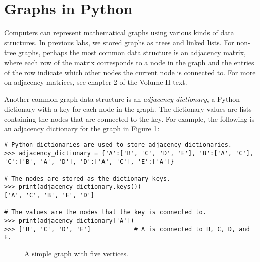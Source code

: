 

\section*{Graphs in Python} %

Computers can represent mathematical graphs using various kinds of data structures.
In previous labs, we stored graphs as trees and linked lists.
For non-tree graphs, perhaps the most common data structure is an adjacency matrix, where each row of the matrix corresponds to a node in the graph and the entries of the row indicate which other nodes the current node is connected to.
For more on adjacency matrices, see chapter 2 of the Volume II text.

Another common graph data structure is an \emph{adjacency dictionary}, a Python dictionary with a key for each node in the graph.
The dictionary values are lists containing the nodes that are connected to the key.
For example, the following is an adjacency dictionary for the graph in Figure \ref{fig:simple_graph}:

\begin{lstlisting}
# Python dictionaries are used to store adjacency dictionaries.
>>> adjacency_dictionary = {'A':['B', 'C', 'D', 'E'], 'B':['A', 'C'],
'C':['B', 'A', 'D'], 'D':['A', 'C'], 'E':['A']}

# The nodes are stored as the dictionary keys.
>>> print(adjacency_dictionary.keys())
['A', 'C', 'B', 'E', 'D']

# The values are the nodes that the key is connected to.
>>> print(adjacency_dictionary['A'])
>>> ['B', 'C', 'D', 'E']            # A is connected to B, C, D, and E.
\end{lstlisting}

\begin{figure}
\centering
{}
\caption{A simple graph with five vertices.}
\label{fig:simple_graph}
\end{figure}

